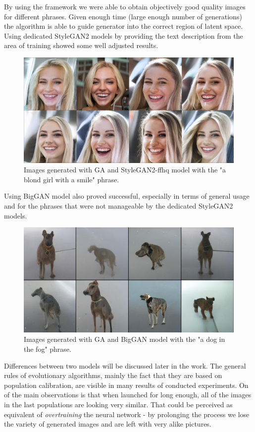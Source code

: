 \documentclass[11pt,a4paper,openany]{book}
\begin{document}
\noindent By using the framework we were able to obtain objectively good quality images for different phrases. Given enough time (large enough number of generations) the algorithm is able to guide generator into the correct region of latent space. Using dedicated StyleGAN2 models by providing the text description from the area of training showed some well adjusted results.

\begin{figure}[H]
    \centering
    \includegraphics[scale=0.6]{figs/blondgirl.png}
    \caption{Images generated with GA and StyleGAN2-ffhq model with the "a blond girl with a smile" phrase.}\label{Fig:blondgirl}
\end{figure}
\newpage
\noindent Using BigGAN model also proved successful, especially in terms of general usage and for the phrases that were not manageable by the dedicated StyleGAN2 models.

\begin{figure}[H]
    \centering
    \includegraphics[scale=0.3]{figs/doginthefog.png}
    \caption{Images generated with GA and BigGAN model with the "a dog in the fog" phrase.}\label{Fig:doginthefog}
\end{figure}
\noindent Differences between two models will be discussed later in the work.\newline
\newline
\noindent The general rules of evolutionary algorithms, mainly the fact that they are based on population calibration, are visible in many results of conducted experiments. On of the main observations is that when launched for long enough, all of the images in the last populations are looking very similar. That could be perceived as equivalent of \textit{overtraining} the neural network - by prolonging the process we lose the variety of generated images and are left with very alike pictures.
\end{document}
